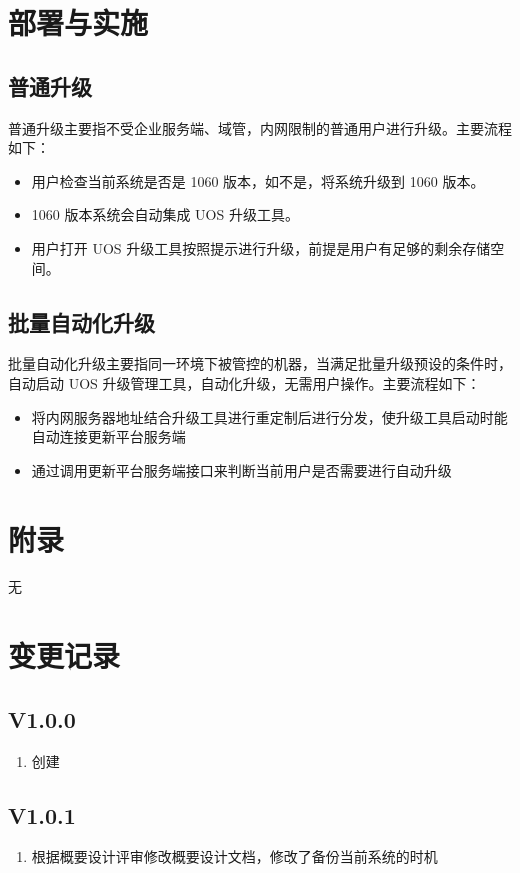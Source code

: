 \documentclass{utart}
\begin{document}
\section{部署与实施}
\subsection{普通升级}
普通升级主要指不受企业服务端、域管，内网限制的普通用户进行升级。主要流程如下：
\begin{itemize}
    \item 用户检查当前系统是否是 1060 版本，如不是，将系统升级到 1060 版本。
    \item 1060 版本系统会自动集成 UOS 升级工具。
    \item 用户打开 UOS 升级工具按照提示进行升级，前提是用户有足够的剩余存储空间。
\end{itemize}

\subsection{批量自动化升级}
批量自动化升级主要指同一环境下被管控的机器，当满足批量升级预设的条件时，自动启动 UOS 升级管理工具，自动化升级，无需用户操作。主要流程如下：
\begin{itemize}
    \item 将内网服务器地址结合升级工具进行重定制后进行分发，使升级工具启动时能自动连接更新平台服务端
    \item 通过调用更新平台服务端接口来判断当前用户是否需要进行自动升级
\end{itemize}

\section{附录}
无

\section{变更记录}
\subsection{V1.0.0}
\begin{enumerate}
    \item 创建
\end{enumerate}

\subsection{V1.0.1}
\begin{enumerate}
    \item 根据概要设计评审修改概要设计文档，修改了备份当前系统的时机
\end{enumerate}
\end{document}
